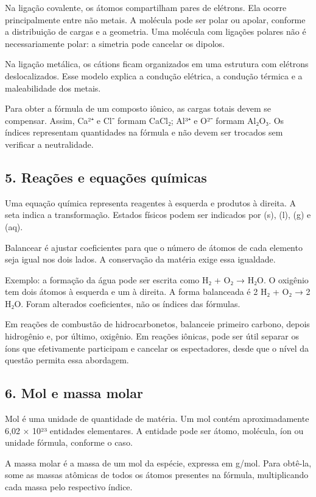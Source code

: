 \documentclass[11pt,a4paper]{article}
\begin{document}
Na ligação covalente, os átomos compartilham pares de elétrons. Ela ocorre principalmente entre não metais. A molécula pode ser polar ou apolar, conforme a distribuição de cargas e a geometria. Uma molécula com ligações polares não é necessariamente polar: a simetria pode cancelar os dipolos.

Na ligação metálica, os cátions ficam organizados em uma estrutura com elétrons deslocalizados. Esse modelo explica a condução elétrica, a condução térmica e a maleabilidade dos metais.

Para obter a fórmula de um composto iônico, as cargas totais devem se compensar. Assim, Ca²⁺ e Cl⁻ formam CaCl₂; Al³⁺ e O²⁻ formam Al₂O₃. Os índices representam quantidades na fórmula e não devem ser trocados sem verificar a neutralidade.

\subsection*{5. Reações e equações químicas}

Uma equação química representa reagentes à esquerda e produtos à direita. A seta indica a transformação. Estados físicos podem ser indicados por (s), (l), (g) e (aq).

Balancear é ajustar coeficientes para que o número de átomos de cada elemento seja igual nos dois lados. A conservação da matéria exige essa igualdade.

Exemplo: a formação da água pode ser escrita como H₂ + O₂ → H₂O. O oxigênio tem dois átomos à esquerda e um à direita. A forma balanceada é 2 H₂ + O₂ → 2 H₂O. Foram alterados coeficientes, não os índices das fórmulas.

Em reações de combustão de hidrocarbonetos, balanceie primeiro carbono, depois hidrogênio e, por último, oxigênio. Em reações iônicas, pode ser útil separar os íons que efetivamente participam e cancelar os espectadores, desde que o nível da questão permita essa abordagem.

\subsection*{6. Mol e massa molar}

Mol é uma unidade de quantidade de matéria. Um mol contém aproximadamente 6,02 × 10²³ entidades elementares. A entidade pode ser átomo, molécula, íon ou unidade fórmula, conforme o caso.

A massa molar é a massa de um mol da espécie, expressa em g/mol. Para obtê-la, some as massas atômicas de todos os átomos presentes na fórmula, multiplicando cada massa pelo respectivo índice.
\end{document}
